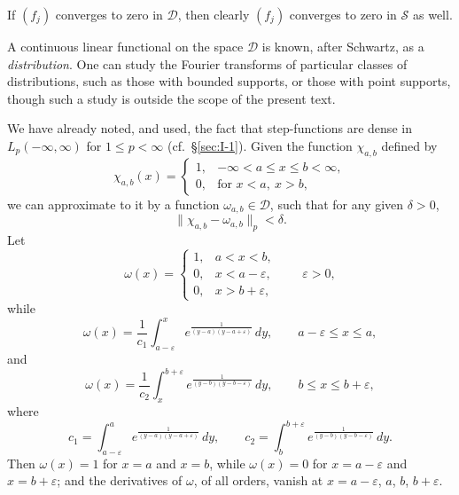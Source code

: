 If $(f_j)$ converges to zero in $\mathcal D$, then clearly $(f_j)$ converges to zero in $\mathcal S$ as well.

A continuous linear functional on the space $\mathcal D$ is known, after Schwartz, as a \emph{distribution}. One can study the Fourier transforms of particular classes of distributions, such as those with bounded supports, or those with point supports, though such a study is outside the scope of the present text.

We have already noted, and used, the fact that step-functions are dense in $L_p(-\infty,\infty)$ for $1\le p<\infty$ (cf.\ \S\ref{sec:I-1}). Given the function $\chi_{a,b}$ defined by
\begin{equation*}
\chi_{a,b}(x)=
\begin{cases}
1,&-\infty<a\le x\le b<\infty,\\
0,&\text{for }x<a,\ x>b,
\end{cases}
\end{equation*}
we can approximate to it by a function $\omega_{a,b}\in\mathcal D$, such that for any given $\delta>0$,
\begin{equation*}
\|\chi_{a,b}-\omega_{a,b}\|_p<\delta.
\end{equation*}
Let
\begin{equation}\label{eq:I-3.12}
\omega(x)=
\begin{cases}
1,&a<x<b,\\
0,&x<a-\varepsilon,\\
0,&x>b+\varepsilon,
\end{cases}
\qquad\varepsilon>0,
\end{equation}
while
\begin{equation*}
\omega(x)=\frac{1}{c_1}\int_{a-\varepsilon}^{x}e^{\frac{1}{(y-a)(y-a+\varepsilon)}}\,dy,
\qquad a-\varepsilon\le x\le a,
\end{equation*}
and
\begin{equation*}
\omega(x)=\frac{1}{c_2}\int_x^{b+\varepsilon}e^{\frac{1}{(y-b)(y-b-\varepsilon)}}\,dy,
\qquad b\le x\le b+\varepsilon,
\end{equation*}
where
\begin{equation*}
c_1=\int_{a-\varepsilon}^{a}e^{\frac{1}{(y-a)(y-a+\varepsilon)}}\,dy,
\qquad
c_2=\int_b^{b+\varepsilon}e^{\frac{1}{(y-b)(y-b-\varepsilon)}}\,dy.
\end{equation*}
Then $\omega(x)=1$ for $x=a$ and $x=b$, while $\omega(x)=0$ for $x=a-\varepsilon$ and $x=b+\varepsilon$; and the derivatives of $\omega$, of all orders, vanish at $x=a-\varepsilon$, $a$, $b$, $b+\varepsilon$.

